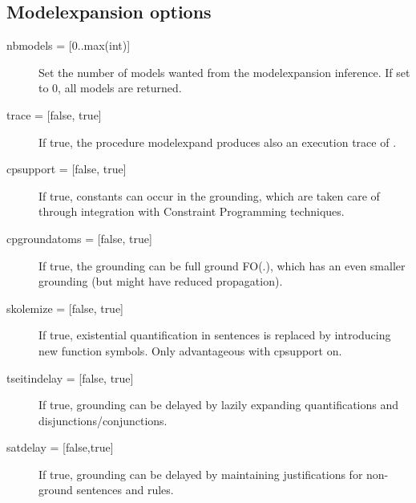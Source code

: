 \subsection{Modelexpansion options}
\begin{description}
	\item[{nbmodels = [0..max(int)]}] Set the number of models wanted from the modelexpansion inference.  If set to 0, all models are returned.
	\item[{trace = [false, true]}] If true, the procedure modelexpand produces also an execution trace of \minisatid.
	\item[{cpsupport = [false, true]}] If true, constants can occur in the grounding, which are taken care of through integration with Constraint Programming techniques. 
	\item[{cpgroundatoms = [false, true]}] If true, the grounding can be full ground FO(.), which has an even smaller grounding (but might have reduced propagation).
	\item[{skolemize = [false, true]}] If true, existential quantification in sentences is replaced by introducing new function symbols. Only advantageous with cpsupport on.
	\item[{tseitindelay = [false, true]}] If true, grounding can be delayed by lazily expanding quantifications and disjunctions/conjunctions.
	\item[{satdelay = [false,true]}] If true, grounding can be delayed by maintaining justifications for non-ground sentences and rules.
\end{description}

